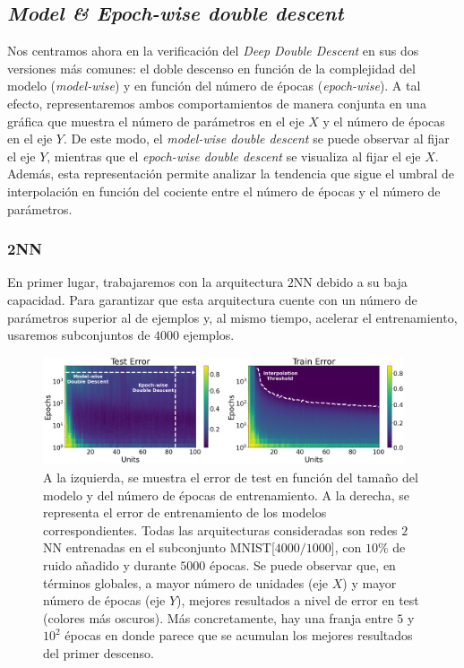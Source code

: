 \subsection{\textit{Model \& Epoch-wise double descent}}\label{subsec:model-epoch-wise}

Nos centramos ahora en la verificación del \textit{Deep Double Descent} en sus dos versiones más comunes: el doble descenso en función de la complejidad del modelo (\textit{model-wise}) y en función del número de épocas (\textit{epoch-wise}). A tal efecto, representaremos ambos comportamientos de manera conjunta en una gráfica que muestra el número de parámetros en el eje $X$ y el número de épocas en el eje $Y$. De este modo, el \textit{model-wise double descent} se puede observar al fijar el eje $Y$, mientras que el \textit{epoch-wise double descent} se visualiza al fijar el eje $X$. Además, esta representación permite analizar la tendencia que sigue el umbral de interpolación en función del cociente entre el número de épocas y el número de parámetros.

\subsubsection{2NN}\label{subsubsec:model-epoch-wise-2NN}

En primer lugar, trabajaremos con la arquitectura $2$NN debido a su baja capacidad. Para garantizar que esta arquitectura cuente con un número de parámetros superior al de ejemplos y, al mismo tiempo, acelerar el entrenamiento, usaremos subconjuntos de $4000$ ejemplos.

\begin{figure}[h]
    \centering
    \includegraphics[width=0.95\textwidth]{img/experiments/model-epoch2NNMNIST.png}
    \caption[Doble descenso en función del tamaño del modelo y del número de épocas para la red $2$NN y un subconjunto de MNIST.]{A la izquierda, se muestra el error de test en función del tamaño del modelo y del número de épocas de entrenamiento. A la derecha, se representa el error de entrenamiento de los modelos correspondientes. Todas las arquitecturas consideradas son redes $2$NN entrenadas en el subconjunto MNIST[$4000/1000$], con $10\%$ de ruido añadido y durante $5000$ épocas. Se puede observar que, en términos globales, a mayor número de unidades (eje $X$) y mayor número de épocas (eje $Y$), mejores resultados a nivel de error en test (colores más oscuros). Más concretamente, hay una franja entre $5$ y $10^2$ épocas en donde parece que se acumulan los mejores resultados del primer descenso.}\label{fig:model-epoch2NNMNIST}
\end{figure}

